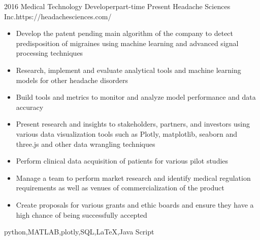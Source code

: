 \begin{experiences}
	\myExperience
	{2016}       {Medical Technology Developer}{part-time}
	{Present}      {Headache Sciences Inc.}{https://headachesciences.com/}
	{
		\begin{itemize}
			\item Develop the patent pending main algorithm of the company to detect predisposition of migraines using machine learning and advanced signal processing techniques
			\item Research, implement and evaluate analytical tools and machine learning models for other headache disorders
			\item Build tools and metrics to monitor and analyze model performance and data accuracy
			\item Present research and insights to stakeholders, partners, and investors using various data visualization tools such as Plotly, matplotlib, seaborn and three.js and other data wrangling techniques
			\item Perform clinical data acquisition of patients for various pilot studies
			\item Manage a team to perform market research and identify medical regulation requirements as well as venues of commercialization of the product
			\item Create proposals for various grants and ethic boards and ensure they have a high chance of being successfully accepted
		\end{itemize}
	}
	{python,MATLAB,plotly,SQL,\LaTeX,Java Script}
	
\end{experiences}
